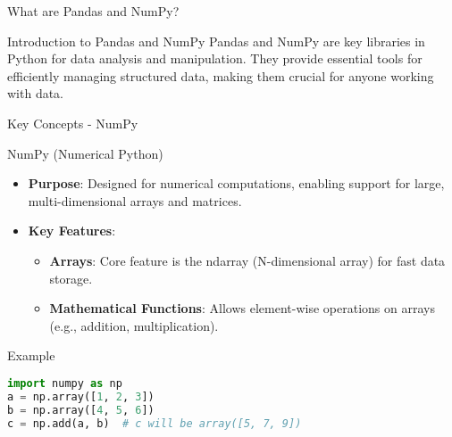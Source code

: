 \documentclass[aspectratio=169]{beamer}
\begin{document}
\begin{frame}{What are Pandas and NumPy?}
    \begin{block}{Introduction to Pandas and NumPy}
        Pandas and NumPy are key libraries in Python for data analysis and manipulation. 
        They provide essential tools for efficiently managing structured data, making them crucial for anyone working with data.
    \end{block}
\end{frame}

\begin{frame}{Key Concepts - NumPy}
    \begin{block}{NumPy (Numerical Python)}
        \begin{itemize}
            \item \textbf{Purpose}: Designed for numerical computations, enabling support for large, multi-dimensional arrays and matrices.
            \item \textbf{Key Features}:
                \begin{itemize}
                    \item \textbf{Arrays}: Core feature is the ndarray (N-dimensional array) for fast data storage.
                    \item \textbf{Mathematical Functions}: Allows element-wise operations on arrays (e.g., addition, multiplication).
                \end{itemize}
        \end{itemize}
    \end{block}
    \begin{block}{Example}
        \begin{lstlisting}[language=Python]
import numpy as np
a = np.array([1, 2, 3])
b = np.array([4, 5, 6])
c = np.add(a, b)  # c will be array([5, 7, 9])
        \end{lstlisting}
    \end{block}
\end{frame}
\end{document}
